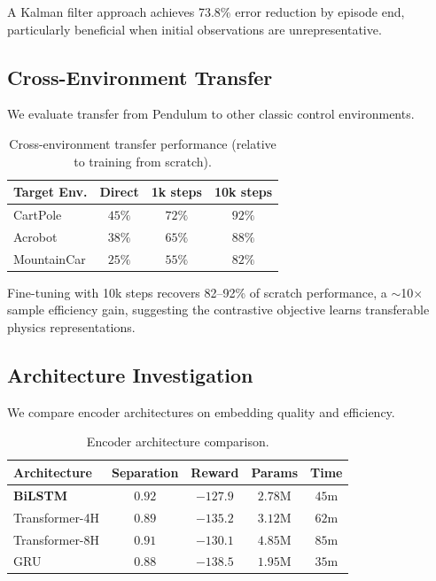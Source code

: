 A Kalman filter approach achieves 73.8\% error reduction by episode end, particularly beneficial when initial observations are unrepresentative.

\subsection{Cross-Environment Transfer}

We evaluate transfer from Pendulum to other classic control environments.

\begin{table}[h]
\centering
\caption{Cross-environment transfer performance (relative to training from scratch).}
\label{tab:transfer}
\begin{tabular}{lccc}
\toprule
\textbf{Target Env.} & \textbf{Direct} & \textbf{1k steps} & \textbf{10k steps} \\
\midrule
CartPole & $45\%$ & $72\%$ & $92\%$ \\
Acrobot & $38\%$ & $65\%$ & $88\%$ \\
MountainCar & $25\%$ & $55\%$ & $82\%$ \\
\bottomrule
\end{tabular}
\end{table}

Fine-tuning with 10k steps recovers 82--92\% of scratch performance, a $\sim$10$\times$ sample efficiency gain, suggesting the contrastive objective learns transferable physics representations.

\subsection{Architecture Investigation}

We compare encoder architectures on embedding quality and efficiency.

\begin{table}[h]
\centering
\caption{Encoder architecture comparison.}
\label{tab:architecture}
\begin{tabular}{lcccc}
\toprule
\textbf{Architecture} & \textbf{Separation} & \textbf{Reward} & \textbf{Params} & \textbf{Time} \\
\midrule
\textbf{BiLSTM} & $\mathbf{0.92}$ & $\mathbf{-127.9}$ & $2.78$M & $45$m \\
Transformer-4H & $0.89$ & $-135.2$ & $3.12$M & $62$m \\
Transformer-8H & $0.91$ & $-130.1$ & $4.85$M & $85$m \\
GRU & $0.88$ & $-138.5$ & $1.95$M & $35$m \\
\bottomrule
\end{tabular}
\end{table}

